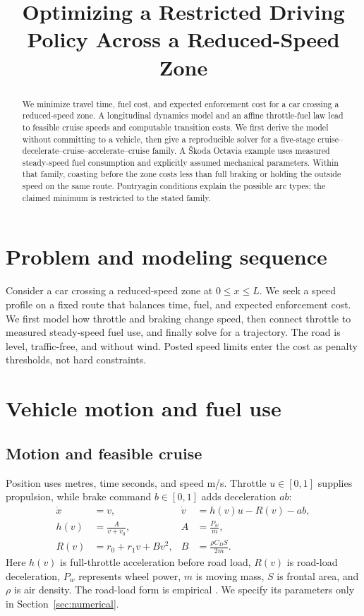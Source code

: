 \documentclass[conference,a4paper]{IEEEtran}
\title{Optimizing a Restricted Driving Policy Across a Reduced-Speed Zone}
\author{}
\begin{document}
\maketitle
\begin{abstract}
We minimize travel time, fuel cost, and expected enforcement cost for a car crossing a reduced-speed zone. A longitudinal dynamics model and an affine throttle-fuel law lead to feasible cruise speeds and computable transition costs. We first derive the model without committing to a vehicle, then give a reproducible solver for a five-stage cruise--decelerate--cruise--accelerate--cruise family. A \v{S}koda Octavia example uses measured steady-speed fuel consumption and explicitly assumed mechanical parameters. Within that family, coasting before the zone costs less than full braking or holding the outside speed on the same route. Pontryagin conditions explain the possible arc types; the claimed minimum is restricted to the stated family.
\end{abstract}

\section{Problem and modeling sequence}
Consider a car crossing a reduced-speed zone at $0\le x\le L$. We seek a speed profile on a fixed route that balances time, fuel, and expected enforcement cost. We first model how throttle and braking change speed, then connect throttle to measured steady-speed fuel use, and finally solve for a trajectory. The road is level, traffic-free, and without wind. Posted speed limits enter the cost as penalty thresholds, not hard constraints.

\section{Vehicle motion and fuel use}
\label{sec:model}
\subsection{Motion and feasible cruise}
Position uses metres, time seconds, and speed m/s. Throttle $u\in[0,1]$ supplies propulsion, while brake command $b\in[0,1]$ adds deceleration $ab$:
\begin{align}
\dot x&=v, & \dot v&=h(v)u-R(v)-ab,\label{eq:dynamics}\\
h(v)&=\frac{A}{v+v_0}, & A&=\frac{P_w}{m},\label{eq:h}\\
R(v)&=r_0+r_1v+Bv^2, & B&=\frac{\rho C_D S}{2m}.\label{eq:R}
\end{align}
Here $h(v)$ is full-throttle acceleration before road load, $R(v)$ is road-load deceleration, $P_w$ represents wheel power, $m$ is moving mass, $S$ is frontal area, and $\rho$ is air density. The road-load form is empirical \cite{roadload}. We specify its parameters only in Section~\ref{sec:numerical}.
\end{document}
